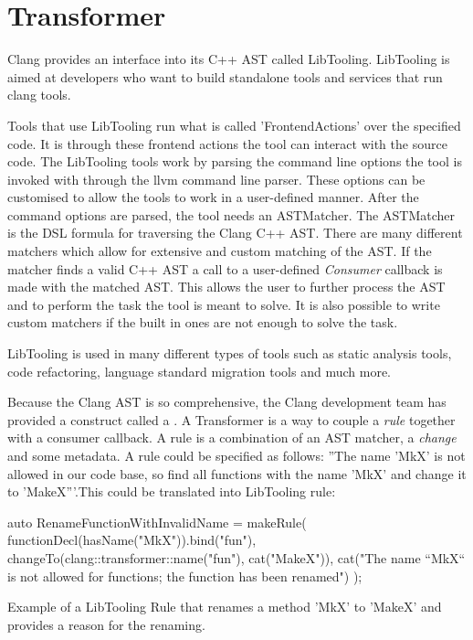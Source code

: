 \section{Transformer}

Clang provides an interface into its C++ AST called LibTooling. LibTooling is aimed at developers who want to build standalone tools and services that run clang tools.\cite{LibToolingClang17}

Tools that use LibTooling run what is called 'FrontendActions' over the specified code. It is through these frontend actions the tool can interact with the source code. The LibTooling tools work by parsing the command line options the tool is invoked with through the llvm command line parser. These options can be customised to allow the tools to work in a user-defined manner. After the command options are parsed, the tool needs an ASTMatcher. The ASTMatcher is the DSL formula for traversing the Clang C++ AST. There are many different matchers which allow for extensive and custom matching of the AST.\cite{ASTMatcherReference,MatchingClangAST} If the matcher finds a valid C++ AST a call to a user-defined \textit{Consumer} callback is made with the matched AST. This allows the user to further process the AST and to perform the task the tool is meant to solve.
It is also possible to write custom matchers if the built in ones are not enough to solve the task.

LibTooling is used in many different types of tools such as static analysis tools, code refactoring, language standard migration tools and much more.\cite{ExternalClangExamples}


Because the Clang AST is so comprehensive, the Clang development team has provided a construct called a . A Transformer is a way to couple a \textit{rule} together with a consumer callback. A rule is a combination of an AST matcher, a \textit{change} and some metadata. A rule could be specified as follows: ''The name 'MkX' is not allowed in our code base, so find all functions with the name 'MkX' and change it to 'MakeX'''.This could be translated into LibTooling rule:

\begin{listing}[H]
    \begin{cppcode}
auto RenameFunctionWithInvalidName = makeRule(
    functionDecl(hasName("MkX")).bind("fun"),
    changeTo(clang::transformer::name("fun"), cat("MakeX")),
    cat("The name ``MkX`` is not allowed for functions; the function has been renamed")
);
    \end{cppcode}
    \caption{Example of a LibTooling Rule that renames a method 'MkX' to 'MakeX' and provides a reason for the renaming.}
    \label{code:080dev:TransformerRuleExample}
\end{listing}

